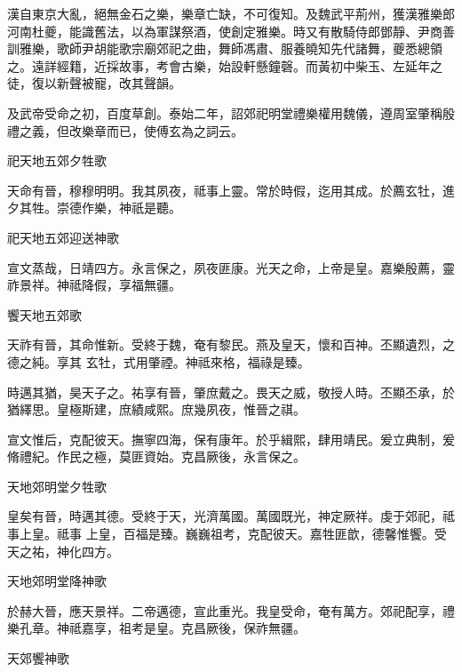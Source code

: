 \begin{pinyinscope}
 漢自東京大亂，絕無金石之樂，樂章亡缺，不可復知。及魏武平荊州，獲漢雅樂郎河南杜夔，能識舊法，以為軍謀祭酒，使創定雅樂。時又有散騎侍郎鄧靜、尹商善訓雅樂，歌師尹胡能歌宗廟郊祀之曲，舞師馮肅、服養曉知先代諸舞，夔悉總領之。遠詳經籍，近採故事，考會古樂，始設軒懸鐘磬。而黃初中柴玉、左延年之徒，復以新聲被寵，改其聲韻。



 及武帝受命之初，百度草創。泰始二年，詔郊祀明堂禮樂權用魏儀，遵周室肇稱殷禮之義，但改樂章而已，使傅玄為之詞云。



 祀天地五郊夕牲歌



 天命有晉，穆穆明明。我其夙夜，祗事上靈。常於時假，迄用其成。於薦玄牡，進夕其牲。崇德作樂，神祇是聽。



 祀天地五郊迎送神歌



 宣文蒸哉，日靖四方。永言保之，夙夜匪康。光天之命，上帝是皇。嘉樂殷薦，靈祚景祥。神祗降假，享福無疆。



 饗天地五郊歌



 天祚有晉，其命惟新。受終于魏，奄有黎民。燕及皇天，懷和百神。丕顯遺烈，之德之純。享其
 玄牡，式用肇禋。神祗來格，福祿是臻。



 時邁其猶，昊天子之。祐享有晉，肇庶戴之。畏天之威，敬授人時。丕顯丕承，於猶繹思。皇極斯建，庶績咸熙。庶幾夙夜，惟晉之祺。



 宣文惟后，克配彼天。撫寧四海，保有康年。於乎緝熙，肆用靖民。爰立典制，爰脩禮紀。作民之極，莫匪資始。克昌厥後，永言保之。



 天地郊明堂夕牲歌



 皇矣有晉，時邁其德。受終于天，光濟萬國。萬國既光，神定厥祥。虔于郊祀，祗事上皇。祗事
 上皇，百福是臻。巍巍祖考，克配彼天。嘉牲匪歆，德馨惟饗。受天之祐，神化四方。



 天地郊明堂降神歌



 於赫大晉，應天景祥。二帝邁德，宣此重光。我皇受命，奄有萬方。郊祀配享，禮樂孔章。神祗嘉享，祖考是皇。克昌厥後，保祚無疆。



 天郊饗神歌




\end{pinyinscope}
